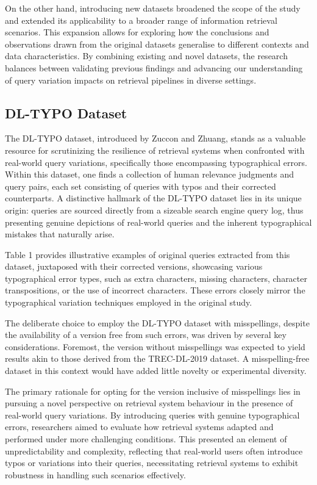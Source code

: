 On the other hand, introducing new datasets broadened the scope of the study and extended its applicability to a broader range of information retrieval scenarios. This expansion allows for exploring how the conclusions and observations drawn from the original datasets generalise to different contexts and data characteristics. By combining existing and novel datasets, the research balances between validating previous findings and advancing our understanding of query variation impacts on retrieval pipelines in diverse settings.

\subsection{DL-TYPO Dataset}
The DL-TYPO dataset, introduced by Zuccon and Zhuang, stands as a valuable resource for scrutinizing the resilience of retrieval systems when confronted with real-world query variations, specifically those encompassing typographical errors. Within this dataset, one finds a collection of human relevance judgments and query pairs, each set consisting of queries with typos and their corrected counterparts. A distinctive hallmark of the DL-TYPO dataset lies in its unique origin: queries are sourced directly from a sizeable search engine query log, thus presenting genuine depictions of real-world queries and the inherent typographical mistakes that naturally arise.

Table 1 provides illustrative examples of original queries extracted from this dataset, juxtaposed with their corrected versions, showcasing various typographical error types, such as extra characters, missing characters, character transpositions, or the use of incorrect characters. These errors closely mirror the typographical variation techniques employed in the original study.

The deliberate choice to employ the DL-TYPO dataset with misspellings, despite the availability of a version free from such errors, was driven by several key considerations. Foremost, the version without misspellings was expected to yield results akin to those derived from the TREC-DL-2019 dataset. A misspelling-free dataset in this context would have added little novelty or experimental diversity.

The primary rationale for opting for the version inclusive of misspellings lies in pursuing a novel perspective on retrieval system behaviour in the presence of real-world query variations. By introducing queries with genuine typographical errors, researchers aimed to evaluate how retrieval systems adapted and performed under more challenging conditions. This presented an element of unpredictability and complexity, reflecting that real-world users often introduce typos or variations into their queries, necessitating retrieval systems to exhibit robustness in handling such scenarios effectively.

